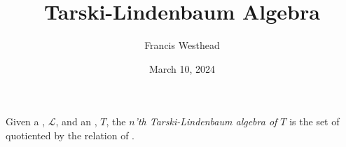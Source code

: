 \documentclass[a4paper]{article}
\title{Tarski-Lindenbaum Algebra}
\date{March 10, 2024}
\author{Francis Westhead}
\begin{document}
\maketitle
\par{Given a , \(\mathcal {L}\), and an , \(T\), the \emph{\(n\)'th Tarski-Lindenbaum algebra of \(T\)} is the set of  quotiented by the relation of .}
\printbibliography
\end{document}
